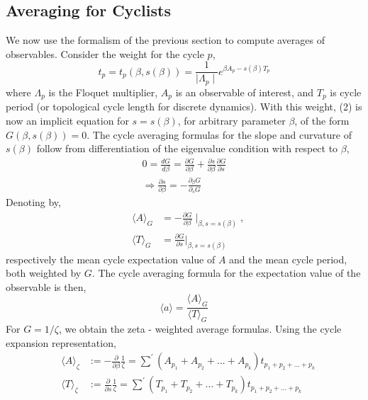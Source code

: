 \documentclass[pre,aps,twocolumn,showpacs,hyperref]{revtex4-1} %
\begin{document}
\subsection{Averaging for Cyclists}
We now use the formalism of the previous section to compute averages of observables. Consider the weight for the cycle $p$,
\begin{equation}
t_{p} = t_{p}(\beta, s(\beta)) = \frac{1}{\mid \Lambda_{p} \mid} e^{\beta A_{p} - s(\beta)T_{p}}
\end{equation}
where $\Lambda_{p}$ is the Floquet multiplier, $A_{p}$ is an observable of interest, and $T_{p}$ is cycle period (or topological cycle length for discrete dynamics). With this weight, (2) is now an implicit equation for $s=s(\beta)$, for arbitrary parameter $\beta$, of the form $G(\beta, s(\beta)) = 0$. The cycle averaging formulas for the slope and curvature of $s(\beta)$ follow from differentiation of the eigenvalue condition with respect to $\beta$,
\begin{eqnarray*}
0 = \frac{d G}{d\beta} = \frac{\partial G}{\partial \beta} + \frac{\partial s}{\partial \beta}\frac{\partial G}{\partial s}
\\ \Rightarrow \frac{\partial s}{\partial \beta} = -\frac{\partial_{\beta}G}{\partial_{s} G}
\end{eqnarray*}
Denoting by,
\begin{eqnarray*}
&\langle A\rangle_{G}& = -\frac{\partial G}{\partial \beta}\mid_{\beta, s=s(\beta)},\\ &\langle T \rangle_{G}& = \frac{\partial G}{\partial s}\vert_{\beta, s=s(\beta)}
\end{eqnarray*}
respectively the mean cycle expectation value of $A$ and the mean cycle period, both weighted by $G$. The cycle averaging formula for the expectation value of the observable is then,
\begin{equation}
\langle a\rangle = \frac{\langle A \rangle_{G}}{\langle T \rangle_{G}}
\end{equation}
For $G = 1/\zeta$, we obtain the zeta - weighted average formulas. Using the cycle expansion representation,
\begin{eqnarray*}
&\langle A \rangle_{\zeta}&:=-\frac{\partial}{\partial \beta}\frac{1}{\zeta}=\sum^{'}(A_{p_{1}}+A_{p_{2}}+...+A_{p_{k}})t_{p_{1}+p_{2}+...+p_{k}} \\
&\langle T \rangle_{\zeta}&:=\frac{\partial}{\partial s}\frac{1}{\zeta}=\sum^{'}(T_{p_{1}}+T_{p_{2}}+...+T_{p_{k}})t_{p_{1}+p_{2}+...+p_{k}}
\end{eqnarray*}
\end{document}
